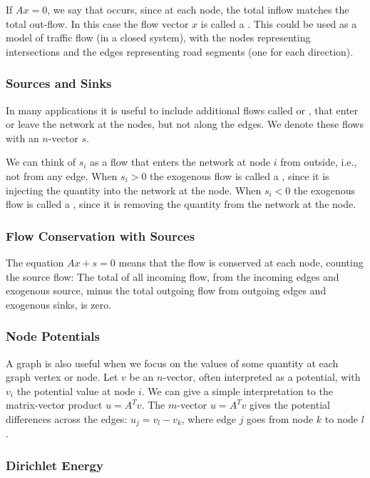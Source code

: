 If $ A x=0 $, we say that  occurs, since at each node, the total inflow matches the total out-flow. In this case the flow vector $ x $ is called a . This could be used as a model of traffic flow (in a closed system), with the nodes representing intersections and the edges representing road segments (one for each
direction).

\subsubsection{Sources and Sinks}

In many applications it is useful to include additional flows called  or , that enter or leave the network at the nodes, but not along the edges. We denote these flows with an $ n $-vector $ s $. 

We can think of $ s_{i} $ as a flow that enters the network at node $ i $ from outside, i.e., not from any edge. When $ s_{i}>0 $ the exogenous flow is called a , since it is injecting the quantity into the network at the node. When $ s_{i}<0 $ the exogenous flow is called a , since it is removing the quantity from the network at the node.

\subsubsection{Flow Conservation with Sources}

The equation $Ax + s = 0$ means that the flow
is conserved at each node, counting the source flow: The total of all incoming flow,
from the incoming edges and exogenous source, minus the total outgoing flow from
outgoing edges and exogenous sinks, is zero.

\subsubsection{Node Potentials}

A graph is also useful when we focus on the values of some quantity at each graph vertex or node. Let $ v $ be an $ n $-vector, often interpreted as a potential, with $ v_{i} $ the potential value at node $ i $. We can give a simple interpretation to the matrix-vector product $ u=A^{T} v $. The $ m $-vector $ u=A^{T} v $ gives the potential differences across the edges: $ u_{j}=v_{l}-v_{k} $, where edge $ j $ goes from node $ k $ to node $ l $.

\subsubsection{Dirichlet Energy}

